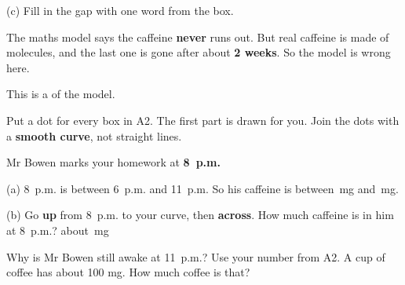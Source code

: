 \documentclass[12pt,a4paper]{article}
\newcommand{\mg}[1][1.8cm]{\blank[#1]\,mg}
\newcommand{\bowenaxes}{%
  \draw[black!14, line width=0.35pt] (0,0) grid[xstep=0.5, ystep=25] (16,400);
  \draw[black!38, line width=0.6pt] (0,0) grid[xstep=1, ystep=50] (16,400);
  \draw[black!80, line width=1.2pt] (0,0) -- (0,410);
  \draw[black!80, line width=1.2pt] (0,0) -- (16.3,0);
  \foreach \v in {0,50,...,400}{
    \draw[black!80, line width=1pt] (0,\v) -- (-0.15,\v);
    \node[left, font=\small] at (-0.15,\v) {\v};}
  \foreach \h/\lab in {0/8,1/9,2/10,3/11,4/12,5/1,6/2,7/3,8/4,9/5,10/6,
                       11/7,12/8,13/9,14/10,15/11,16/12}{
    \draw[black!80, line width=1pt] (\h,0) -- (\h,-8);
    \node[below, font=\small] at (\h,-8) {\lab};}
  \node[font=\footnotesize\bfseries, text=black!65] at (1.5,-46) {a.m.};
  \node[font=\footnotesize\bfseries, text=black!65] at (4,-46) {noon};
  \node[font=\footnotesize\bfseries, text=black!65] at (10,-46) {p.m.};
  \node[font=\footnotesize\bfseries, text=black!65] at (16,-46) {midnight};
  \node[font=\small\bfseries] at (8,-78) {Time};
  \node[rotate=90, font=\small\bfseries] at (-1.55,200)
    {Caffeine in Mr Bowen (mg)};
}
\begin{document}
\vspace{12pt}
\noindent\begin{minipage}{\linewidth}
\noindent (c) Fill in the gap with one word from the box.

\vspace{4pt}
\begin{center}
\end{center}

\vspace{2pt}
\noindent The maths model says the caffeine \textbf{never} runs out. But real
caffeine is made of molecules, and the last one is gone after about
\textbf{2 weeks}. So the model is wrong here.

\vspace{8pt}
\noindent This is a \blank[4.0cm] of the model.
\end{minipage}

\noindent\begin{minipage}{\linewidth}
\noindent Put a dot for every box in A2. The first part is drawn for you. Join
the dots with a \textbf{smooth curve}, not straight lines.

\vspace{6pt}
\begin{center}
\end{center}
\end{minipage}

\noindent Mr Bowen marks your homework at \textbf{8~p.m.}

\vspace{8pt}
\noindent (a) 8~p.m. is between 6~p.m. and 11~p.m. So his caffeine is between
\mg[1.4cm] and \mg[1.4cm].

\vspace{10pt}
\noindent (b) Go \textbf{up} from 8~p.m. to your curve, then \textbf{across}.
How much caffeine is in him at 8~p.m.? \quad about \mg

\noindent Why is Mr Bowen still awake at 11~p.m.? Use your number from A2.
A cup of coffee has about 100 mg. How much coffee is that?
\end{document}
